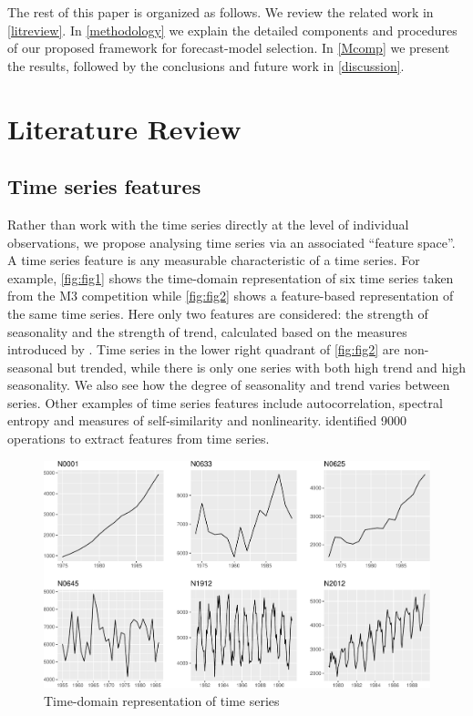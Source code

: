 \documentclass[11pt,a4paper,]{article}
\theoremstyle{definition}
\theoremstyle{definition}
\theoremstyle{definition}
\theoremstyle{remark}
\begin{document}
The rest of this paper is organized as follows. We review the related
work in \autoref{litreview}. In \autoref{methodology} we explain the
detailed components and procedures of our proposed framework for
forecast-model selection. In \autoref{Mcomp} we present the results,
followed by the conclusions and future work in \autoref{discussion}.

\hypertarget{litreview}{%
\section{Literature Review}\label{litreview}}

\hypertarget{time-series-features}{%
\subsection{Time series features}\label{time-series-features}}

Rather than work with the time series directly at the level of
individual observations, we propose analysing time series via an
associated ``feature space''. A time series feature is any measurable
characteristic of a time series. For example, \autoref{fig:fig1} shows
the time-domain representation of six time series taken from the M3
competition \autocite{makridakis2000m3} while \autoref{fig:fig2} shows a
feature-based representation of the same time series. Here only two
features are considered: the strength of seasonality and the strength of
trend, calculated based on the measures introduced by
\textcite{wang2009rule}. Time series in the lower right quadrant of
\autoref{fig:fig2} are non-seasonal but trended, while there is only one
series with both high trend and high seasonality. We also see how the
degree of seasonality and trend varies between series. Other examples of
time series features include autocorrelation, spectral entropy and
measures of self-similarity and nonlinearity.
\textcite{fulcher2014highly} identified 9000 operations to extract
features from time series.

\begin{figure}

{\centering \includegraphics[width=\textwidth]{figure/fig1-1} 

}

\caption{Time-domain representation of time series}\label{fig:fig1}
\end{figure}
\end{document}
